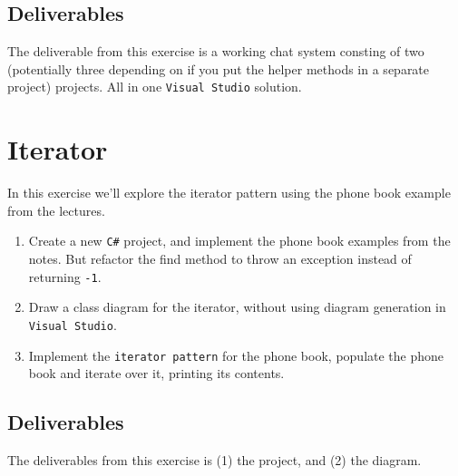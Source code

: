 \documentclass{article}
\newcounter{stepcounter}
\newenvironment{steps}{ 
  \begin{enumerate}[label=\color{red}Step \theenumi)]
    \setcounter{enumi}{\value{stepcounter}}
}{
  \setcounter{stepcounter}{\value{enumi}}
  \end{enumerate}
}
\begin{document}
\subsection{Deliverables}
The deliverable from this exercise is a working chat system consting of two (potentially three depending on if you put the helper methods in a separate project) projects. All in one \texttt{Visual Studio} solution.








\pagebreak
\section{Iterator}
In this exercise we'll explore the iterator pattern using the phone book example from the lectures.
\begin{steps}
  \item Create a new \texttt{C\#} project, and implement the phone book examples from the notes. But refactor the find method to throw an exception instead of returning \texttt{-1}.
  \item Draw a class diagram for the iterator, without using diagram generation in \texttt{Visual Studio}.
  \item Implement the \texttt{iterator pattern} for the phone book, populate the phone book and iterate over it, printing its contents.
\end{steps}
\subsection{Deliverables}
The deliverables from this exercise is (1) the project, and (2) the diagram.
\end{document}
